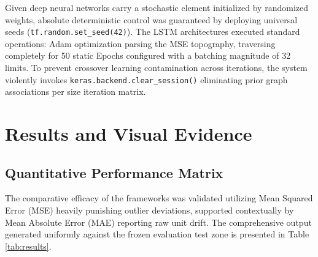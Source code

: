 \documentclass[12pt,onecolumn]{IEEEtran}
\begin{document}
Given deep neural networks carry a stochastic element initialized by randomized weights, absolute deterministic control was guaranteed by deploying universal seeds (\texttt{tf.random.set\_seed(42)}). The LSTM architectures executed standard operations: Adam optimization parsing the MSE topography, traversing completely for 50 static Epochs configured with a batching magnitude of 32 limits. To prevent crossover learning contamination across iterations, the system violently invokes \texttt{keras.backend.clear\_session()} eliminating prior graph associations per size iteration matrix.

\section{Results and Visual Evidence}

\subsection{Quantitative Performance Matrix}
The comparative efficacy of the frameworks was validated utilizing Mean Squared Error (MSE) heavily punishing outlier deviations, supported contextually by Mean Absolute Error (MAE) reporting raw unit drift. The comprehensive output generated uniformly against the frozen evaluation test zone is presented in Table \ref{tab:results}.

\begin{table}[H]
\centering
\caption{Comprehensive Tabular Extract of Model Performance evaluated across expanding subsets of Training Data.}
\label{tab:results}
\vspace{0.5em}
\end{table}
\end{document}
